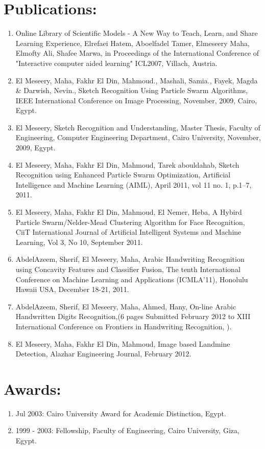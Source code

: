 \documentclass{article}
\begin{document}
 \section*{Publications:}
 \begin{enumerate}
  \item Online Library of Scientific Models - A New Way to Teach, Learn, and Share Learning Experience, Elrefaei Hatem, Aboelfadel Tamer, Elmeseery Maha, Elmofty Ali, Shafee Marwa, in Proceedings of the International Conference of "Interactive computer aided learning" ICL2007, Villach, Austria.\textbf{\underbar{}}
  \item El Meseery, Maha, Fakhr El Din, Mahmoud., Mashali, Samia., Fayek, Magda \& Darwish, Nevin., Sketch Recognition Using Particle Swarm Algorithms,  IEEE International Conference on Image Processing, November,  2009, Cairo, Egypt.
  \item El Meseery, Sketch Recognition and Understanding,  Master Thesis, Faculty of Engineering, Computer Engineering Department, Cairo University, November, 2009, Egypt.
  \item El Meseery, Maha, Fakhr El Din, Mahmoud, Tarek abouldahab, Sketch Recognition using Enhanced Particle Swarm Optimization, Artificial Intelligence and Machine Learning (AIML), April 2011, vol 11 no. 1, p.1--7, 2011.
\item El Meseery, Maha, Fakhr El Din, Mahmoud,  El Nemer, Heba,  A Hybird Particle Swarm/Nelder-Mead Clustering Algorithm for Face Recognition, CiiT International Journal of Artificial Intelligent Systems and Machine Learning, Vol 3, No 10, September 2011. 
\item AbdelAzeem, Sherif, El Meseery, Maha, Arabic Handwriting Recognition using Concavity Features and Classifier Fusion, The tenth International Conference on Machine Learning and Applications (ICMLA'11),  Honolulu Hawaii USA, December 18-21, 2011. 
  \item AbdelAzeem, Sherif, El Meseery, Maha, Ahmed, Hany, On-line Arabic Handwritten Digits Recognition,(6 pages Submitted February 2012 to XIII International Conference on Frontiers in Handwriting Recognition, ).
\item El Meseery, Maha, Fakhr El Din, Mahmoud, Image based Landmine Detection, Alazhar Engineering Journal, February 2012. 
\end{enumerate}
 \section*{Awards:}
  \begin{enumerate}
    \item Jul 2003: Cairo University Award for Academic Distinction, Egypt.
	\item 1999 - 2003: Fellowship, Faculty of Engineering, Cairo University, Giza,
	Egypt.
  \end{enumerate}
\end{document}
